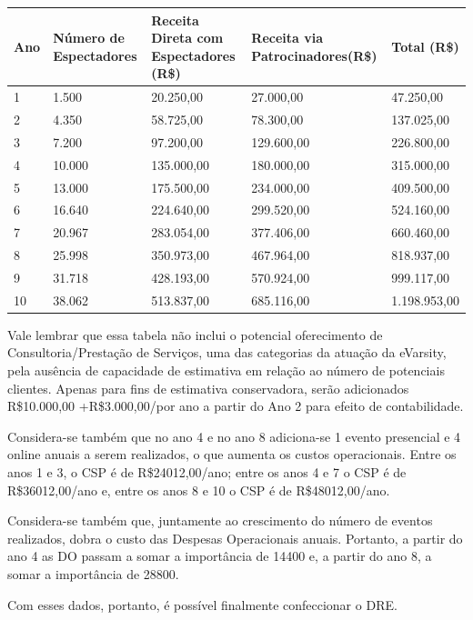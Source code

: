 \documentclass[a4paper, 12pt]{paper}
\begin{document}
\begin{table}[ht]
	\centering
	\begin{tabular}{p{1cm}p{3cm}p{3.5cm}p{3.5cm}p{3cm}}
		\hline
		\cellcolor{gray}Ano&\cellcolor{gray}Número de Espectadores&\cellcolor{gray}Receita Direta com Espectadores (R\$)&\cellcolor{gray}Receita via Patrocinadores(R\$)&\cellcolor{gray}Total (R\$)\\
		\hline
		1&1.500&20.250,00&27.000,00&47.250,00\\
		2&4.350&58.725,00&78.300,00&137.025,00\\
		3&7.200&97.200,00&129.600,00&226.800,00\\
		4&10.000&135.000,00&180.000,00&315.000,00\\
		5&13.000&175.500,00&234.000,00&409.500,00\\
		6&16.640&224.640,00&299.520,00&524.160,00\\
		7&20.967&283.054,00&377.406,00&660.460,00\\
		8&25.998&350.973,00&467.964,00&818.937,00\\
		9&31.718&428.193,00&570.924,00&999.117,00\\
		10&38.062&513.837,00&685.116,00&1.198.953,00\\
		\hline
	\end{tabular}
\end{table}

Vale lembrar que essa tabela não inclui o potencial oferecimento de Consultoria/Prestação de Serviços, uma das categorias da atuação da eVarsity, pela ausência de capacidade de estimativa em relação ao número de potenciais clientes. Apenas para fins de estimativa conservadora, serão adicionados R\$10.000,00 +R\$3.000,00/por ano a partir do Ano 2 para efeito de contabilidade.

Considera-se também que no ano 4 e no ano 8 adiciona-se 1 evento presencial e 4 online anuais a serem realizados, o que aumenta os custos operacionais. Entre os anos 1 e 3, o CSP é de R\$24012,00/ano; entre os anos 4 e 7 o CSP é de R\$36012,00/ano e, entre os anos 8 e 10 o CSP é de R\$48012,00/ano.

Considera-se também que, juntamente ao crescimento do número de eventos realizados, dobra o custo das Despesas Operacionais anuais. Portanto, a partir do ano 4 as DO passam a somar a importância de 14400 e, a partir do ano 8, a somar a importância de 28800.

Com esses dados, portanto, é possível finalmente confeccionar o DRE.
\end{document}
